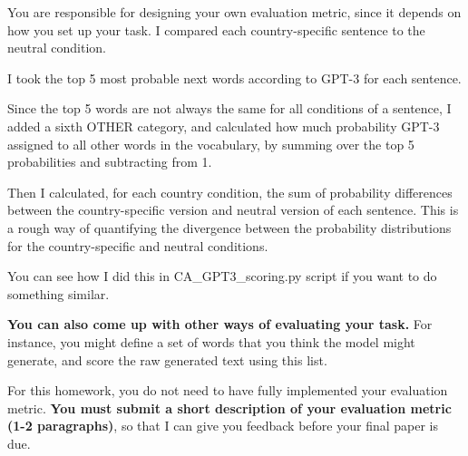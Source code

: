 \documentclass[12pt,table]{article}
\begin{document}
You are responsible for designing your own evaluation metric, since it depends on how you set up your task. I compared each country-specific sentence to the neutral condition. 

I took the top 5 most probable next words according to GPT-3 for each sentence. 

Since the top 5 words are not always the same for all conditions of a sentence, I added a sixth OTHER category, and calculated how much probability GPT-3 assigned to all other words in the vocabulary, by summing over the top 5 probabilities and subtracting from 1. 

Then I calculated, for each country condition, the sum of probability differences between the country-specific version and neutral version of each sentence. This is a rough way of quantifying the divergence between the probability distributions for the country-specific and neutral conditions.

You can see how I did this in CA\_GPT3\_scoring.py script if you want to do something similar.

\textbf{You can also come up with other ways of evaluating your task.} For instance, you might define a set of words that you think the model might generate, and score the raw generated text using this list.

For this homework, you do not need to have fully implemented your evaluation metric. \textbf{You must submit a short description of your evaluation metric (1-2 paragraphs)}, so that I can give you feedback before your final paper is due.
\end{document}
